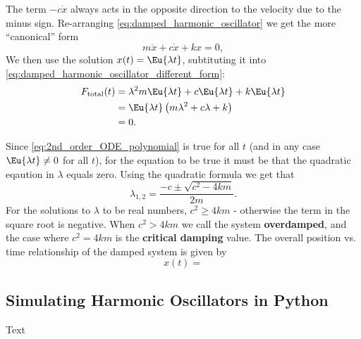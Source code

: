 The term $-c\dot{x}$ always acts in the opposite direction to the velocity due to the minus sign. Re-arranging \autoref{eq:damped_harmonic_oscillator} we get the more \enquote{canonical} form
\begin{equation}
  m\ddot{x} + c\dot{x} + kx = 0,
  \label{eq:damped_harmonic_oscillator_different_form}
\end{equation}
We then use the solution $x(t)=\Eu{\lambda t}$, subtituting it into \autoref{eq:damped_harmonic_oscillator_different_form}:
\begin{align}
  F_{\text{total}}(t) &= \lambda^{2}m\Eu{\lambda t} + c\Eu{\lambda t} + k\Eu{\lambda t}\\
  &= \Eu{\lambda t}\left(m\lambda^{2}+c\lambda+k\right)\\
  &= 0.
  \label{eq:2nd_order_ODE_polynomial}
\end{align}

Since \autoref{eq:2nd_order_ODE_polynomial} is true for all $t$ (and in any case $\Eu{\lambda t}\neq 0$ for all $t$), for the equation to be true it must be that the quadratic eqaution in $\lambda$ equals zero. Using the quadratic formula we get that
\begin{equation}
  \lambda_{1,2} = \frac{-c\pm\sqrt{c^{2}-4km}}{2m}.
  \label{eq:2nd_order_ODE_polynomial_solution}
\end{equation}
For the solutions to $\lambda$ to be real numbers, $c^{2}\geq4km$ - otherwise the term in the square root is negative. When $c^{2}>4km$ we call the system \textbf{overdamped}, and the case where $c^{2}=4km$ is the \textbf{critical damping} value. The overall position vs. time relationship of the damped system is given by
\begin{equation}
  x(t) = 
  \label{eq:label}
\end{equation}

\subsection{Simulating Harmonic Oscillators in Python}
Text
